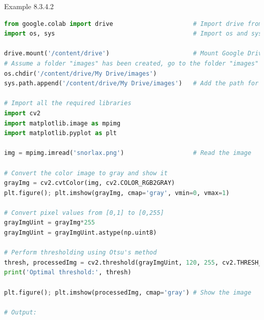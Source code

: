 \documentclass{book}
\begin{document}
\begin{egBox}{Example 8.3.4.2}{}
    \begin{lstlisting}[language=Python, basicstyle=\ttfamily\small, keywordstyle=\color{blue}, commentstyle=\color{forestgreen}, stringstyle=\color{red}, showstringspaces=false]
from google.colab import drive                      # Import drive from google.colab package
import os, sys                                      # Import os and sys modules

drive.mount('/content/drive')                       # Mount Google Drive
# Assume a folder "images" has been created, go to the folder "images"
os.chdir('/content/drive/My Drive/images')
sys.path.append('/content/drive/My Drive/images')   # Add the path for interpreter to search

# Import all the required libraries
import cv2
import matplotlib.image as mpimg
import matplotlib.pyplot as plt

img = mpimg.imread('snorlax.png')                   # Read the image

# Convert the color image to gray and show it
grayImg = cv2.cvtColor(img, cv2.COLOR_RGB2GRAY)
plt.figure(); plt.imshow(grayImg, cmap='gray', vmin=0, vmax=1)

# Convert pixel values from [0,1] to [0,255]
grayImgUint = grayImg*255
grayImgUint = grayImgUint.astype(np.uint8)

# Perform thresholding using Otsu's method
thresh, processedImg = cv2.threshold(grayImgUint, 120, 255, cv2.THRESH_BINARY + cv2.THRESH_OTSU)
print('Optimal threshold:', thresh)

plt.figure(); plt.imshow(processedImg, cmap='gray') # Show the image

# Output:


\end{lstlisting}
\end{egBox}
\end{document}
